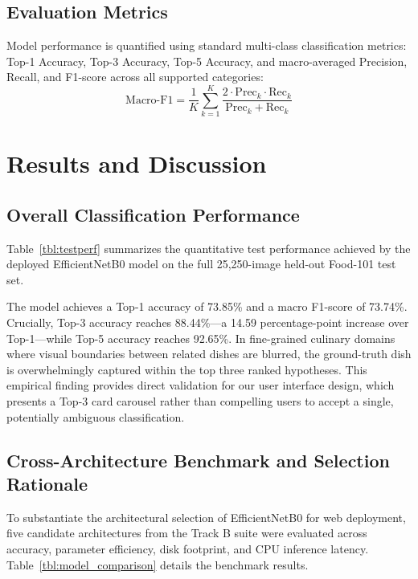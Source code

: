\documentclass[conference]{IEEEtran}
\begin{document}
\subsection{Evaluation Metrics}
Model performance is quantified using standard multi-class classification metrics: Top-1 Accuracy, Top-3 Accuracy, Top-5 Accuracy, and macro-averaged Precision, Recall, and F1-score across all supported categories:
\begin{equation}
\text{Macro-F1} = \frac{1}{K} \sum_{k=1}^{K} \frac{2 \cdot \text{Prec}_k \cdot \text{Rec}_k}{\text{Prec}_k + \text{Rec}_k}
\end{equation}

\section{Results and Discussion}
\subsection{Overall Classification Performance}
Table~\ref{tbl:testperf} summarizes the quantitative test performance achieved by the deployed EfficientNetB0 model on the full 25,250-image held-out Food-101 test set.



The model achieves a Top-1 accuracy of 73.85\% and a macro F1-score of 73.74\%. Crucially, Top-3 accuracy reaches 88.44\%---a 14.59 percentage-point increase over Top-1---while Top-5 accuracy reaches 92.65\%. In fine-grained culinary domains where visual boundaries between related dishes are blurred, the ground-truth dish is overwhelmingly captured within the top three ranked hypotheses. This empirical finding provides direct validation for our user interface design, which presents a Top-3 card carousel rather than compelling users to accept a single, potentially ambiguous classification.

\subsection{Cross-Architecture Benchmark and Selection Rationale}
To substantiate the architectural selection of EfficientNetB0 for web deployment, five candidate architectures from the Track B suite were evaluated across accuracy, parameter efficiency, disk footprint, and CPU inference latency. Table~\ref{tbl:model_comparison} details the benchmark results.

{\setlength{\tabcolsep}{2.5pt}}
\end{document}
